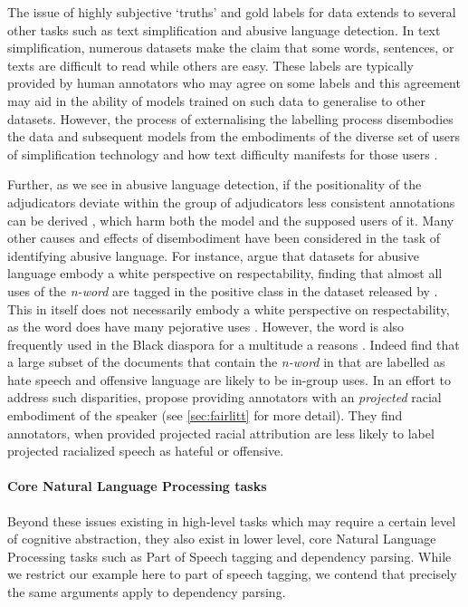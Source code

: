 The issue of highly subjective `truths' and gold labels for data extends to several other tasks such as text simplification and abusive language detection. In text simplification, numerous datasets make the claim that some words, sentences, or texts are difficult to read while others are easy. These labels are typically provided by human annotators who may agree on some labels and this agreement may aid in the ability of models trained on such data to generalise to other datasets. However, the process of externalising the labelling process disembodies the data and subsequent models from the embodiments of the diverse set of users of simplification technology and how text difficulty manifests for those users \cite{Bingel:2018}.

Further, as we see in abusive language detection, if the positionality of the adjudicators deviate within the group of adjudicators less consistent annotations can be derived \cite{Waseem:2016}, which harm both the model and the supposed users of it. Many other causes and effects of disembodiment have been considered in the task of identifying abusive language. For instance, \citet{Waseem:2018} argue that datasets for abusive language embody a white perspective on respectability, finding that almost all uses of the \textit{n-word} are tagged in the positive class in the dataset released by \citet{Davidson:2017}. This in itself does not necessarily embody a white perspective on respectability, as the word does have many pejorative uses \cite{Croom:2013}. However, the word is also frequently used in the Black diaspora for a multitude a reasons \cite{Croom:2013,Rahman:2012}. Indeed \citet{Waseem:2018} find that a large subset of the documents that contain the \textit{n-word} in \citet{Davidson:2017} that are labelled as hate speech and offensive language are likely to be in-group uses. In an effort to address such disparities, \citet{Sap:2019} propose providing annotators with an \textit{projected} racial embodiment of the speaker (see \autoref{sec:fairlitt} for more detail). They find annotators, when provided projected racial attribution are less likely to label projected racialized speech as hateful or offensive.

\paragraph{Core Natural Language Processing tasks}
Beyond these issues existing in high-level tasks which may require a certain level of cognitive abstraction, they also exist in lower level, core Natural Language Processing tasks such as Part of Speech tagging and dependency parsing. While we restrict our example here to part of speech tagging, we contend that precisely the same arguments apply to dependency parsing.

